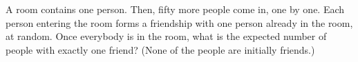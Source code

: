 A room contains one person. Then, fifty more people come in, one by one. Each person entering the room forms a friendship with one person already in the room, at random. Once everybody is in the room, what is the expected number of people with exactly one friend? (None of the people are initially friends.)
